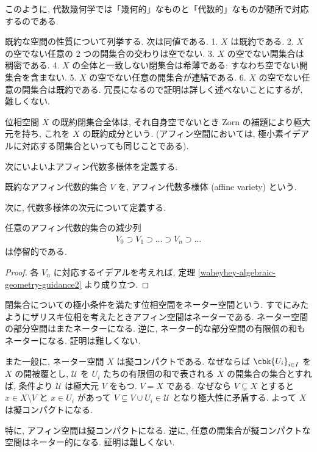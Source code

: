 \documentclass[openany, a4paper, oneside]{jsbook}
\begin{document}
このように, 代数幾何学では「幾何的」なものと「代数的」なものが随所で対応するのである.
\begin{rem}
既約な空間の性質について列挙する.
次は同値である.
1. $X$ は既約である.
2. $X$ の空でない任意の 2 つの開集合の交わりは空でない.
3. $X$ の空でない開集合は稠密である.
4. $X$ の全体と一致しない閉集合は希薄である: すなわち空でない開集合を含まない.
5. $X$ の空でない任意の開集合が連結である.
6. $X$ の空でない任意の開集合は既約である.
冗長になるので証明は詳しく述べないことにするが, 難しくない. \fin
\end{rem}

\begin{defn}[既約成分]
位相空間 $X$ の既約閉集合全体は,
それ自身空でないとき Zorn の補題により極大元を持ち, これを $X$ の既約成分という.
(アフィン空間においては, 極小素イデアルに対応する閉集合といっても同じことである). \fin
\end{defn}

次にいよいよアフィン代数多様体を定義する.
\begin{defn}[アフィン代数多様体]
既約なアフィン代数的集合 $V$ を, アフィン代数多様体 (affine variety) という. \fin
\end{defn}

次に, 代数多様体の次元について定義する.
\begin{prop}\label{waheyhey-algebraic-geometry-guidance5}
任意のアフィン代数的集合の減少列
\begin{align}
 V_0 \supset V_1 \supset \dots \supset V_n \supset \dots
\end{align}
は停留的である. \fin
\end{prop}
\begin{proof}
各 $V_n$ に対応するイデアルを考えれば, 定理 \ref{waheyhey-algebraic-geometry-guidance2} より成り立つ.
\end{proof}
\begin{rem}
閉集合についての極小条件を満たす位相空間をネーター空間という.
すでにみたようにザリスキ位相を考えたときアフィン空間はネーターである.
ネーター空間の部分空間はまたネーターになる.
逆に, ネーター的な部分空間の有限個の和もネーターになる. 証明は難しくない.

また一般に, ネーター空間 $X$ は擬コンパクトである.
なぜならば $\cbk{U_i}_{i \in I}$ を $X$ の開被覆とし,
$\mathcal{U}$ を $U_i$ たちの有限個の和で表される $X$ の開集合の集合とすれば,
条件より $\mathcal{U}$ は極大元 $V$ をもつ.
$V=X$ である.
なぜなら $V \subsetneq X$ とすると $x \in X \setminus V$ と
$x \in U_i$ があって $V \subsetneq V \cup U_i \in \mathcal{U}$ となり極大性に矛盾する.
よって $X$ は擬コンパクトになる.

特に, アフィン空間は擬コンパクトになる.
逆に, 任意の開集合が擬コンパクトな空間はネーター的になる.
証明は難しくない. \fin
\end{rem}
\end{document}
